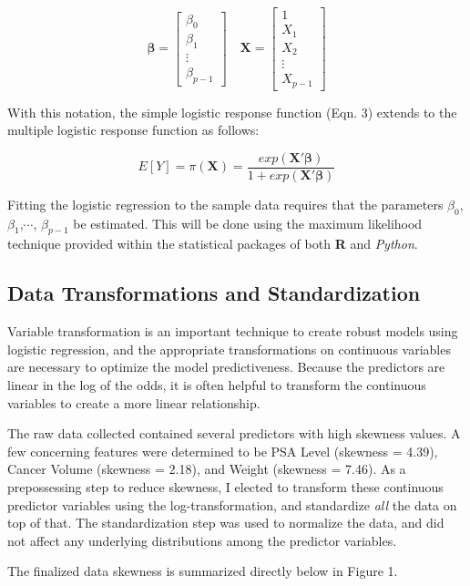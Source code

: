 \[
	\boldsymbol{\beta} = 
	\begin{bmatrix}
		\beta_0 \\ \beta_1 \\ \vdots \\ \beta_{p-1}
	\end{bmatrix} \quad
	\textbf{X} = 
	\begin{bmatrix}
		1 \\ X_1 \\ X_2 \\ \vdots \\ X_{p-1}
	\end{bmatrix} 
\]

With this notation, the simple logistic response function (Eqn. 3) extends to the multiple logistic response function as follows:

\begin{equation}
	E[Y] = \pi(\textbf{X}) = \frac{exp(\textbf{X}'\boldsymbol{\beta})}{1+exp(\textbf{X}'\boldsymbol{\beta})}
\end{equation}

Fitting the logistic regression to the sample data requires that the parameters \(\beta_0\), \(\beta_1\),\(\cdots\), \(\beta_{p-1}\) be estimated. This will be done using the maximum likelihood technique provided within the statistical packages of both \textbf{R} and \textit{Python}.

\subsection{Data Transformations and Standardization}
Variable transformation is an important technique to create robust models using logistic regression, and the appropriate transformations on continuous variables are necessary to optimize the model predictiveness. Because the predictors are linear in the log of the odds, it is often helpful to transform the continuous variables to create a more linear relationship. \par 
The raw data collected contained several predictors with high skewness values. A few concerning features were determined to be PSA Level (skewness = 4.39), Cancer Volume (skewness = 2.18), and Weight (skewness = 7.46). As a prepossessing step to reduce skewness, I elected to transform these continuous predictor variables using the log-transformation, and standardize \textit{all} the data on top of that. The standardization step was used to normalize the data, and did not affect any underlying distributions among the predictor variables. \par
The finalized data skewness is summarized directly below in Figure 1. 

